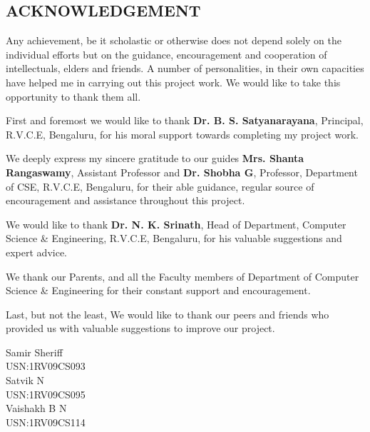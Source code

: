 \documentclass[12pt,a4paper]{report}
\begin{document}
  
\setcounter{page}{1}
\begin{center}
\section*{ACKNOWLEDGEMENT}
\end{center}
Any achievement, be it scholastic or otherwise does not depend solely on the individual efforts but on the guidance, encouragement and cooperation of intellectuals, elders and friends. A number of personalities, in their own capacities have helped me in carrying out this project work. We would like to take this opportunity to thank them all.

First and foremost we would like to thank \textbf{Dr. B. S. Satyanarayana}, Principal, R.V.C.E, Bengaluru, for his moral support towards completing my project work.

We deeply express my sincere gratitude to our guides \textbf{Mrs. Shanta Rangaswamy}, Assistant Professor and \textbf{Dr. Shobha G}, Professor, Department of CSE, R.V.C.E, Bengaluru, for their able guidance, regular source of encouragement and assistance throughout this project. 

We would like to thank \textbf{Dr. N. K. Srinath}, Head of Department, Computer Science \& Engineering, R.V.C.E, Bengaluru, for his valuable suggestions and expert advice.

We thank our Parents, and all the Faculty members of Department of Computer Science \& Engineering for their constant support and encouragement.

Last, but not the least, We would like to thank our peers and friends who provided us with valuable suggestions to improve our project.
\\
\begin{flushright}
Samir Sheriff\\
USN:1RV09CS093\\

Satvik N\\
USN:1RV09CS095\\

Vaishakh B N\\ 
USN:1RV09CS114\\

\end{flushright}

\newpage
\end{document}
